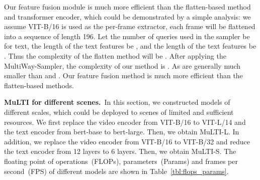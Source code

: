 \documentclass[10pt,twocolumn,letterpaper]{article}
\begin{document}
Our feature fusion module is much more efficient than the flatten-based method and transformer encoder, which could be demonstrated by a simple analysis: we assume VIT-B/16 is used as the per-frame extractor, each frame will be flattened into a sequence of length 196. Let the number of queries used in the sampler be  for text, the length of the text features be , and the length of the text features be . Thus the complexity of the flatten method will be . After applying the MultiWay-Sampler, the complexity of our method is . As  are generally much smaller than  and . Our feature fusion method is much more efficient than the flatten-based methods. 

\textbf{MuLTI for different scenes.}~In this section, we constructed models of different scales, which could be deployed to scenes of limited and sufficient resources. We first replace the video encoder from VIT-B/16 to VIT-L/14 and the text encoder from bert-base\cite{Devlin2018Bert} to bert-large\cite{Devlin2018Bert}. Then, we obtain MuLTI-L. 
In addition, we replace the video encoder from VIT-B/16 to VIT-B/32 and reduce the text encoder from 12 layers to 6 layers. Then, we obtain MuLTI-S. The floating point of operations~(FLOPs), parameters~(Params) and frames per second~(FPS) of different models are shown in Table~\ref{tbl:flops_params}.
\end{document}
